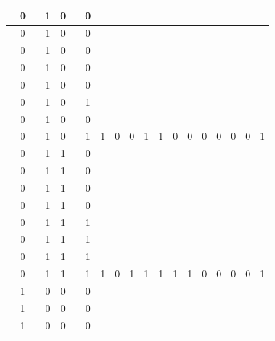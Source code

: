 \begin{table}[!tb]
\begin{tabular}{|c|c|c|c|c|c|c|c|c|c|c|c|c|c|c|c|c|c|c|}
        \rowcolor{red!40}  & 0 &  & 1 & 0 &  & 0 &  &  &  &  &  &  &  &  &  &  &  &  \\ \hline
        \rowcolor{red!40}  & 0 &  & 1 & 0 &  & 0 &  &  &  &  &  &  &  &  &  &  &  &  \\ \hline
        \rowcolor{red!40}  & 0 &  & 1 & 0 &  & 0 &  &  &  &  &  &  &  &  &  &  &  &  \\ \hline
        \rowcolor{red!40}  & 0 &  & 1 & 0 &  & 0 &  &  &  &  &  &  &  &  &  &  &  &  \\ \hline
        \rowcolor{red!40}  & 0 &  & 1 & 0 &  & 0 &  &  &  &  &  &  &  &  &  &  &  &  \\ \hline
        \rowcolor{red!40}  & 0 &  & 1 & 0 &  & 1 &  &  &  &  &  &  &  &  &  &  &  &  \\ \hline
        \rowcolor{red!40}  & 0 &  & 1 & 0 &  & 0 &  &  &  &  &  &  &  &  &  &  &  &  \\ \hline
        \rowcolor{red!40}  & 0 &  & 1 & 0 &  & 1 & 1 & 0 & 0 & 1 & 1 & 0 & 0 & 0 & 0 & 0 & 0 & 1 \\ \hline
        \rowcolor{green!40}  & 0 &  & 1 & 1 &  & 0 &  &  &  &  &  &  &  &  &  &  &  &  \\ \hline
        \rowcolor{green!40}  & 0 &  & 1 & 1 &  & 0 &  &  &  &  &  &  &  &  &  &  &  &  \\ \hline
        \rowcolor{green!40}  & 0 &  & 1 & 1 &  & 0 &  &  &  &  &  &  &  &  &  &  &  &  \\ \hline
        \rowcolor{green!40}  & 0 &  & 1 & 1 &  & 0 &  &  &  &  &  &  &  &  &  &  &  &  \\ \hline
        \rowcolor{green!40}  & 0 &  & 1 & 1 &  & 1 &  &  &  &  &  &  &  &  &  &  &  &  \\ \hline
        \rowcolor{green!40}  & 0 &  & 1 & 1 &  & 1 &  &  &  &  &  &  &  &  &  &  &  &  \\ \hline
        \rowcolor{green!40}  & 0 &  & 1 & 1 &  & 1 &  &  &  &  &  &  &  &  &  &  &  &  \\ \hline
        \rowcolor{green!40}  & 0 &  & 1 & 1 &  & 1 & 1 & 0 & 1 & 1 & 1 & 1 & 1 & 0 & 0 & 0 & 0 & 1 \\ \hline
        \rowcolor{yellow!40}  & 1 &  & 0 & 0 &  & 0 &  &  &  &  &  &  &  &  &  &  &  &  \\ \hline
        \rowcolor{yellow!40}  & 1 &  & 0 & 0 &  & 0 &  &  &  &  &  &  &  &  &  &  &  &  \\ \hline
        \rowcolor{yellow!40}  & 1 &  & 0 & 0 &  & 0 &  &  &  &  &  &  &  &  &  &  &  &  \\ \hline

\end{tabular}
\end{table}
